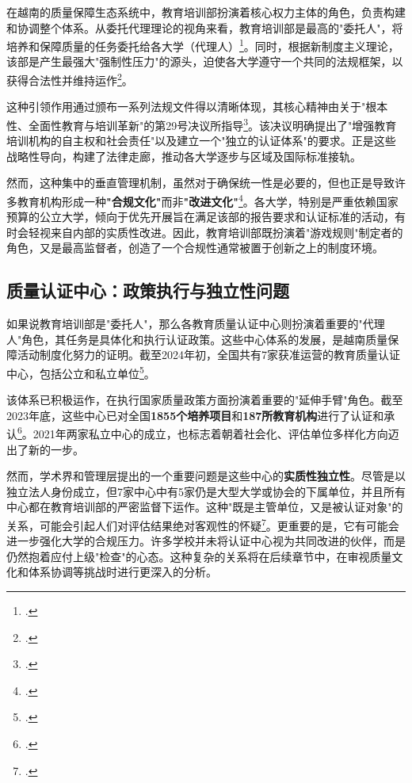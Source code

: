 在越南的质量保障生态系统中，教育培训部扮演着核心权力主体的角色，负责构建和协调整个体系。从委托代理理论的视角来看，教育培训部是最高的"委托人"，将培养和保障质量的任务委托给各大学（代理人）\footcite{Kivisto2008}。同时，根据新制度主义理论，该部是产生最强大"强制性压力"的源头，迫使各大学遵守一个共同的法规框架，以获得合法性并维持运作\footcite{MeyerPowell2020}。

这种引领作用通过颁布一系列法规文件得以清晰体现，其核心精神由关于"根本性、全面性教育与培训革新"的第29号决议所指导\footcite{nghi_quyet_29_2013}。该决议明确提出了"增强教育培训机构的自主权和社会责任"以及建立一个"独立的认证体系"的要求。正是这些战略性导向，构建了法律走廊，推动各大学逐步与区域及国际标准接轨。

然而，这种集中的垂直管理机制，虽然对于确保统一性是必要的，但也正是导致许多教育机构形成一种\textbf{"合规文化"}而非\textbf{"改进文化"}\footcite{pham2021governance}。各大学，特别是严重依赖国家预算的公立大学，倾向于优先开展旨在满足该部的报告要求和认证标准的活动，有时会轻视来自内部的实质性改进。因此，教育培训部既扮演着"游戏规则"制定者的角色，又是最高监督者，创造了一个合规性通常被置于创新之上的制度环境。

\subsection{质量认证中心：政策执行与独立性问题}
\label{subsec:vai_tro_trungtamkd}

如果说教育培训部是"委托人"，那么各教育质量认证中心则扮演着重要的"代理人"角色，其任务是具体化和执行认证政策。这些中心体系的发展，是越南质量保障活动制度化努力的证明。截至2024年初，全国共有7家获准运营的教育质量认证中心，包括公立和私立单位\footcite{tuoitre_kdcl_stats_2024}。

该体系已积极运作，在执行国家质量政策方面扮演着重要的"延伸手臂"角色。截至2023年底，这些中心已对全国\textbf{1855个培养项目}和\textbf{187所教育机构}进行了认证和承认\footcite{tuoitre_kdcl_stats_2024}。2021年两家私立中心的成立，也标志着朝着社会化、评估单位多样化方向迈出了新的一步。

然而，学术界和管理层提出的一个重要问题是这些中心的\textbf{实质性独立性}。尽管是以独立法人身份成立，但7家中心中有5家仍是大型大学或协会的下属单位，并且所有中心都在教育培训部的严密监督下运作。这种"既是主管单位，又是被认证对象"的关系，可能会引起人们对评估结果绝对客观性的怀疑\footcite{giaoducnet_kdcl_list_2023}。更重要的是，它有可能会进一步强化大学的合规压力。许多学校并未将认证中心视为共同改进的伙伴，而是仍然抱着应付上级"检查"的心态。这种复杂的关系将在后续章节中，在审视质量文化和体系协调等挑战时进行更深入的分析。


